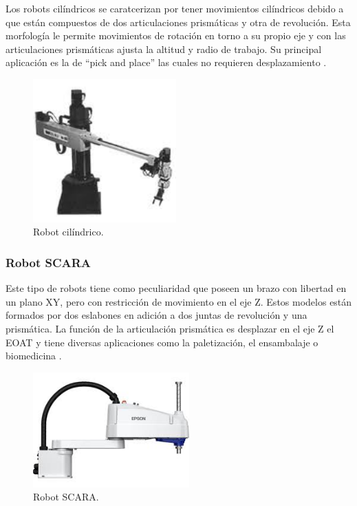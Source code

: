 Los robots cilíndricos se caratcerizan por tener movimientos cilíndricos debido a que están compuestos de dos articulaciones prismáticas y otra de revolución. Esta morfología le permite movimientos de rotación en torno a su propio eje y con las articulaciones prismáticas ajusta la altitud y radio de trabajo. Su principal aplicación es la de ``pick and place'' las cuales no requieren desplazamiento \cite{tipos_robots_2}.

\begin{figure} [h!]
  \begin{center}
    \includegraphics[width=5.5cm]{figs/robot_cilindrico}
  \end{center}
  \caption{\centering Robot cilíndrico.}
  \label{fig:robot_cilindrico}
\end{figure} 

\subsubsection{Robot SCARA}

Este tipo de robots tiene como peculiaridad que poseen un brazo con libertad en un plano XY, pero con restricción de movimiento en el eje Z. Estos modelos están formados por dos eslabones en adición a dos juntas de revolución y una prismática. La función de la articulación prismática es desplazar en el eje Z el EOAT y tiene diversas aplicaciones como la paletización, el ensambalaje o biomedicina \cite{tipos_robots_1}.

\begin{figure} [h!]
  \begin{center}
    \includegraphics[width=6cm]{figs/robot_SCARA}
  \end{center}
  \caption{\centering Robot SCARA.}
  \label{fig:robot_SCARA}
\end{figure} 

